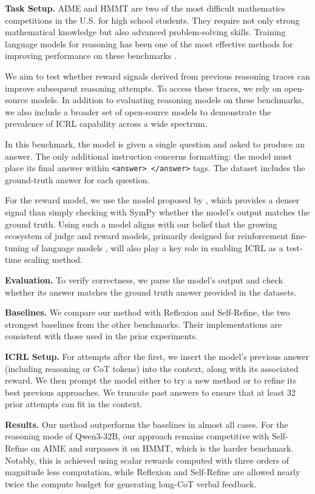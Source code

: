 \documentclass{article} %
\newcommand{\0}{\mathbf{0}}
\begin{document}
\textbf{Task Setup.}
AIME \citep{aime} and HMMT \citep{hmmt} are two of the most difficult mathematics competitions in the U.S. for high school students. They require not only strong mathematical knowledge but also advanced problem-solving skills. Training language models for reasoning has been one of the most effective methods for improving performance on these benchmarks \citep{dsr1}.

We aim to test whether reward signals derived from previous reasoning traces can improve subsequent reasoning attempts. To access these traces, we rely on open-source models. In addition to evaluating reasoning models on these benchmarks, we also include a broader set of open-source models to demonstrate the prevalence of ICRL capability across a wide spectrum.

In this benchmark, the model is given a single question and asked to produce an answer. The only additional instruction concerns formatting: the model must place its final answer within \texttt{<answer> </answer>}  tags. The dataset includes the ground-truth answer for each question.

For the reward model, we use the model proposed by \citet{suCrossingRewardBridge2025}, which provides a denser signal than simply checking with SymPy whether the model’s output matches the ground truth. Using such a model aligns with our belief that the growing ecosystem of judge and reward models, primarily designed for reinforcement fine-tuning of language models \citep{lightman2023lets}, will also play a key role in enabling ICRL as a test-time scaling method.

\textbf{Evaluation.}
To verify correctness, we parse the model’s output and check whether its answer matches the ground truth answer provided in the datasets.

\textbf{Baselines.}
We compare our method with Reflexion and Self-Refine, the two strongest baselines from the other benchmarks. Their implementations are consistent with those used in the prior experiments.

\textbf{ICRL Setup.}
For attempts after the first, we insert the model’s previous answer (including reasoning or CoT tokens) into the context, along with its associated reward. We then prompt the model either to try a new method or to refine its best previous approaches. We truncate past answers to ensure that at least 32 prior attempts can fit in the context.

\textbf{Results.}
Our method outperforms the baselines in almost all cases. For the reasoning mode of Qwen3-32B, our approach remains competitive with Self-Refine on AIME and surpasses it on HMMT, which is the harder benchmark. Notably, this is achieved using scalar rewards computed with three orders of magnitude less computation, while Reflexion and Self-Refine are allowed nearly twice the compute budget for generating long-CoT verbal feedback.
\end{document}

